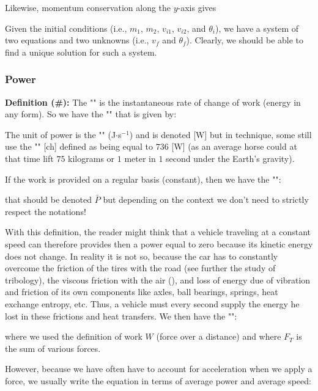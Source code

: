 	
	Likewise, momentum conservation along the $y$-axis gives 
	
	
	Given the initial conditions (i.e., $m_1$, $m_2$, $v_{i1}$, $v_{i2}$, and $\theta_i$), we have a system of two equations  and two unknowns (i.e., $v_f$ and $\theta_f$). Clearly, we should be able to find a unique solution for such a system.
	
	\subsubsection{Power}
	\textbf{Definition (\#\mydef):} The "" is the instantaneous rate of change of work (energy in any form). So we have the "" that is given by:
	
	The unit of power is the "" (J$\cdot$s$^{-1}$) and is denoted [W] but in technique, some still use the "" [ch] defined as being equal to $736$ [W] (as an average horse could at that time lift $75$ kilograms or $1$ meter in $1$ second under the Earth's gravity).
	
	If the work is provided on a regular basis (constant), then we have the "":
	
	that should be denoted $\bar{P}$ but depending on the context we don't need to strictly respect the notations!
	
	With this definition, the reader might think that a vehicle traveling at a constant speed can therefore provides then a power equal to zero because its kinetic energy does not change. In reality it is not so, because the car has to constantly overcome the friction of the tires with the road (see further the study of tribology), the viscous friction with the air (), and loss of energy due of vibration and friction of its own components like axles, ball bearings, springs, heat exchange entropy, etc. Thus, a vehicle must every second supply the energy he lost in these frictions and heat transfers. We then have the "":	
	
	where we used the definition of work $W$ (force over a distance) and where $F_T$ is the sum of various forces.
	
	However, because we have often have to account for acceleration when we apply a force, we usually write the equation in terms of average power and average speed:
	
